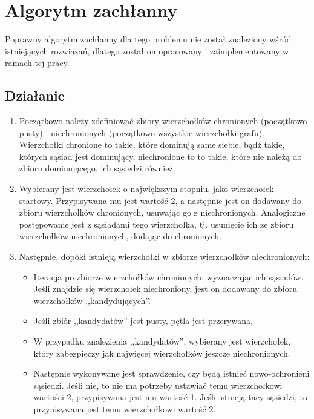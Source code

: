     \section{Algorytm zachłanny}

    Poprawny algorytm zachłanny dla tego problemu nie został znaleziony wśród istniejących rozwiązań, dlatego został on opracowany i zaimplementowany w ramach tej pracy. 

    \subsection{Działanie}
    
    \begin{enumerate}
        \item Początkowo należy zdefiniować zbiory wierzchołków chronionych (początkowo pusty) i niechronionych (początkowo wszystkie wierzchołki grafu). Wierzchołki chronione to takie, które dominują same siebie, bądź takie, których sąsiad jest dominujący, niechronione to to takie, które nie należą do zbioru dominującego, ich sąsiedzi również.
        \item Wybierany jest wierzchołek o największym stopniu, jako wierzchołek startowy. Przypisywana mu jest wartość 2, a następnie jest on dodawany do zbioru wierzchołków chronionych, usuwając go z niechronionych. Analogiczne postępowanie jest z sąsiadami tego wierzchołka, tj. usunięcie ich ze zbioru wierzchołków niechronionych, dodając do chronionych. 
        \item Następnie, dopóki istnieją wierzchołki w zbiorze wierzchołków niechronionych:
        \begin{itemize}
            \item Iteracja po zbiorze wierzchołków chronionych, wyznaczając ich sąsiadów. Jeśli znajdzie się wierzchołek niechroniony, jest on dodawany do zbioru wierzchołków ,,kandydujących''.
            \item Jeśli zbiór ,,kandydatów'' jest pusty, pętla jest przerywana,
            \item W przypadku znalezienia ,,kandydatów'', wybierany jest wierzchołek, który zabezpieczy jak najwięcej wierzchołków jeszcze niechronionych.
            \item Następnie wykonywane jest sprawdzenie, czy będą istnieć nowo-ochronieni sąsiedzi. Jeśli nie, to nie ma potrzeby ustawiać temu wierzchołkowi wartości 2, przypisywana jest mu wartość 1. Jeśli istnieją tacy sąsiedzi, to przypisywana jest temu wierzchołkowi wartość 2. 
        \end{itemize}
    \end{enumerate}

